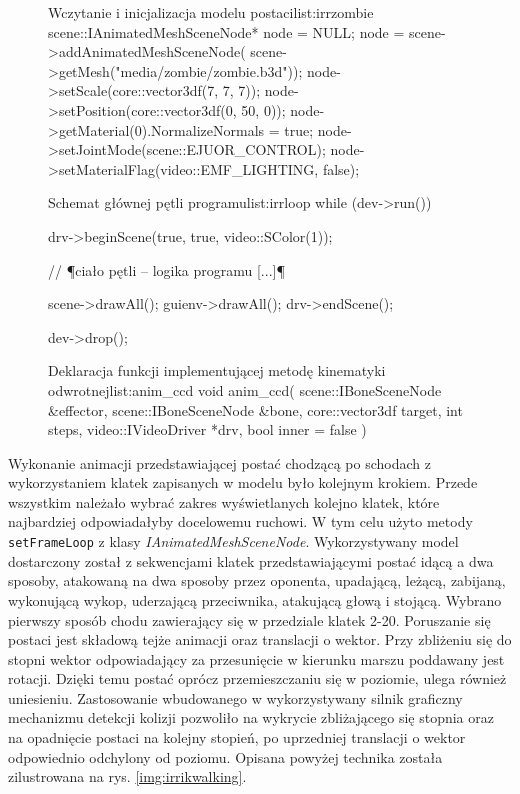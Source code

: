 \documentclass[11pt]{mwrep}
\begin{document}
\begin{figure}[p]
\begin{listing}{Wczytanie i inicjalizacja modelu postaci}{list:irrzombie}
	scene::IAnimatedMeshSceneNode* node = NULL;
	node = scene->addAnimatedMeshSceneNode(
			scene->getMesh("media/zombie/zombie.b3d"));
	node->setScale(core::vector3df(7, 7, 7));
	node->setPosition(core::vector3df(0, 50, 0));
	node->getMaterial(0).NormalizeNormals = true;
	node->setJointMode(scene::EJUOR_CONTROL);
	node->setMaterialFlag(video::EMF_LIGHTING, false);
\end{listing}
\end{figure}

\begin{figure}[p]
\begin{listing}{Schemat głównej pętli programu}{list:irrloop}
	while (dev->run()) {
		drv->beginScene(true, true, video::SColor(1));

		// ¶ciało pętli -- logika programu [...]¶

		scene->drawAll();
		guienv->drawAll();
		drv->endScene();
	}
	dev->drop();
\end{listing}
\end{figure}

\begin{figure}[p]
\begin{listing}{Deklaracja funkcji implementującej metodę kinematyki odwrotnej}{list:anim_ccd}
void anim_ccd( scene::IBoneSceneNode &effector,
		  scene::IBoneSceneNode &bone,
		  core::vector3df target,
		  int steps,
		  video::IVideoDriver *drv,
		  bool inner = false  )
\end{listing}
\end{figure}
Wykonanie animacji przedstawiającej postać chodzącą po schodach z wykorzystaniem klatek zapisanych w modelu było kolejnym krokiem. Przede wszystkim należało wybrać zakres wyświetlanych kolejno klatek, które najbardziej odpowiadałyby docelowemu ruchowi. W tym celu użyto metody \texttt{setFrameLoop} z klasy \textit{IAnimatedMeshSceneNode}. Wykorzystywany model dostarczony został z sekwencjami klatek przedstawiającymi postać idącą a dwa sposoby, atakowaną na dwa sposoby przez oponenta, upadającą, leżącą, zabijaną, wykonującą wykop, uderzającą przeciwnika, atakującą głową i stojącą. Wybrano pierwszy sposób chodu zawierający się w przedziale klatek 2-20. Poruszanie się postaci jest składową tejże animacji oraz translacji o wektor. Przy zbliżeniu się do stopni wektor odpowiadający za przesunięcie w kierunku marszu poddawany jest rotacji. Dzięki temu postać oprócz przemieszczaniu się w poziomie, ulega również uniesieniu. Zastosowanie wbudowanego w wykorzystywany silnik graficzny mechanizmu detekcji kolizji pozwoliło na wykrycie zbliżającego się stopnia oraz na opadnięcie postaci na kolejny stopień, po uprzedniej translacji o wektor odpowiednio odchylony od poziomu. Opisana powyżej technika została zilustrowana na rys. \ref{img:irrikwalking}.
\end{document}
